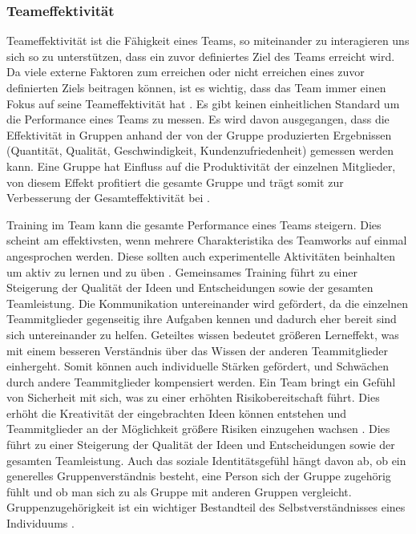 \documentclass[a4paper,11pt]{article}%
\renewcommand{\\}{\vspace*{0.5\baselineskip} \newline}
\begin{document}
		\subsubsection{Teameffektivität}
\label{Teameffektivität}
\dq{}Teameffektivität\dq{} ist die Fähigkeit eines Teams, so miteinander zu interagieren uns sich so zu unterstützen, dass ein zuvor definiertes Ziel des Teams erreicht wird. Da viele externe Faktoren zum erreichen oder nicht erreichen eines zuvor definierten Ziels beitragen können, ist es wichtig, dass das Team immer einen Fokus auf seine Teameffektivität hat \citep[p.557]{salas2005there}.
	Es gibt keinen einheitlichen Standard um die Performance eines Teams zu messen. Es wird davon ausgegangen, dass die Effektivität in Gruppen anhand der von der Gruppe produzierten Ergebnissen (Quantität, Qualität, Geschwindigkeit, Kundenzufriedenheit) gemessen werden kann. Eine Gruppe hat Einfluss auf die Produktivität der einzelnen Mitglieder, von diesem Effekt profitiert die gesamte Gruppe und trägt somit zur Verbesserung der Gesamteffektivität bei \citep[p.309]{guzzo1996teams}.
	
Training im Team kann die gesamte Performance eines Teams steigern. Dies scheint am effektivsten, wenn mehrere Charakteristika des Teamworks auf einmal angesprochen werden. Diese sollten auch experimentelle Aktivitäten beinhalten um aktiv zu lernen und zu üben \citep[19]{mcewan2017effectiveness}.
Gemeinsames Training führt zu einer Steigerung der Qualität der Ideen und Entscheidungen sowie der gesamten Teamleistung.
Die Kommunikation untereinander wird gefördert, da die einzelnen Teammitglieder gegenseitig ihre Aufgaben kennen und dadurch eher bereit sind sich untereinander zu helfen.
Geteiltes wissen bedeutet größeren Lerneffekt, was mit einem besseren Verständnis über das Wissen der anderen Teammitglieder einhergeht. Somit können auch individuelle Stärken gefördert, und Schwächen durch andere Teammitglieder kompensiert werden.
Ein Team bringt ein Gefühl von Sicherheit mit sich, was zu einer erhöhten Risikobereitschaft führt. Dies erhöht die Kreativität der eingebrachten Ideen können entstehen und Teammitglieder an der Möglichkeit größere Risiken einzugehen wachsen \citep[p. 2-4]{biech2007pfeiffer}.
Dies führt zu einer Steigerung der Qualität der Ideen und Entscheidungen sowie der gesamten Teamleistung.
Auch das soziale Identitätsgefühl hängt davon ab, ob ein generelles Gruppenverständnis besteht, eine Person sich der Gruppe zugehörig fühlt und ob man sich zu als Gruppe mit anderen Gruppen vergleicht. Gruppenzugehörigkeit ist ein wichtiger Bestandteil des Selbstverständnisses eines Individuums \citep{sutantovicious}.
	
\end{document}
